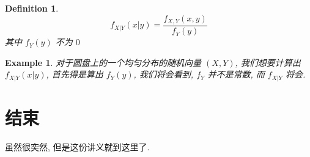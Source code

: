\documentclass[a4paper, 10pt]{ctexart} %
\newtheorem{example}{\llap{$\rhd$ \space}Example}
\newtheorem{definition}{Definition}
\begin{document}
\begin{definition}
    \[
    f _{X | Y} \left(x | y\right) = \frac{f _{X , Y} \left(x, y\right) }{ f_{Y} \left(y\right)}
    \]
    其中 $f_{Y} \left(y\right)$ 不为 $0$
\end{definition}
\begin{example}
    对于圆盘上的一个均匀分布的随机向量 $\left(X, Y\right)$, 我们想要计算出 $f _{X | Y} (x | y   )$, 
    首先得是算出 $f _{Y} \left(y\right)$, 我们将会看到, $f _{Y}$ 并不是常数, 而 $f _{X | Y}$ 将会.
\end{example}

\section{结束}
虽然很突然, 但是这份讲义就到这里了.
\end{document}
